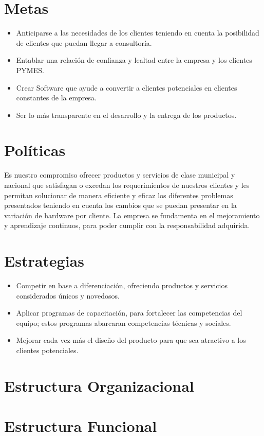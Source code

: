 \section{Metas}
\begin{itemize}
\item Anticiparse a las necesidades de los clientes teniendo en cuenta la posibilidad de 
clientes que puedan llegar a consultoría.
\item Entablar una relación de confianza y lealtad entre la empresa y los clientes PYMES.
\item Crear Software que ayude a convertir a clientes potenciales en clientes constantes 
de la empresa.
\item Ser lo más transparente en el desarrollo y la entrega de los productos.
\end{itemize}

\section{Pol\'iticas}
Es nuestro compromiso ofrecer productos y servicios de clase municipal y nacional que 
satisfagan o excedan los requerimientos de nuestros clientes y les permitan solucionar de 
manera eficiente y eficaz los diferentes problemas presentados teniendo en cuenta los 
cambios que se puedan presentar en la variación de hardware por cliente. La empresa se fundamenta en el mejoramiento y aprendizaje continuos, para poder cumplir con la responsabilidad adquirida.

\section{Estrategias}
\begin{itemize}
\item Competir en base a diferenciación, ofreciendo productos y servicios considerados 
únicos y novedosos.
\item Aplicar programas de capacitación, para fortalecer las competencias del equipo; 
estos programas abarcaran competencias técnicas y sociales.
\item Mejorar cada vez más el diseño del producto para que sea atractivo a los clientes 
potenciales.
\end{itemize}

\section{Estructura Organizacional}

\section{Estructura Funcional}
